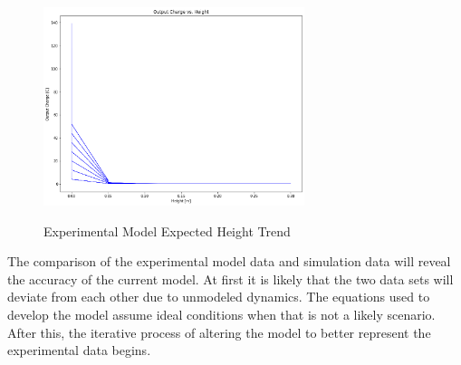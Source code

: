 \begin{figure}
    \begin{center}
    \includegraphics[width=3in]{fig37.png}
    \end{center}
    \renewcommand{\baselinestretch}{1}
    \small\normalsize
    \begin{quote}
    \caption[Experimental Model Expected Height Trend]{Experimental Model Expected Height Trend} \label{fig: f37}
    \end{quote}
\end{figure}

The comparison of the experimental model data and simulation data will reveal the accuracy of the current model. 
At first it is likely that the two data sets will deviate from each other due to unmodeled dynamics. 
The equations used to develop the model assume ideal conditions when that is not a likely scenario. 
After this, the iterative process of altering the model to better represent the experimental data begins. 